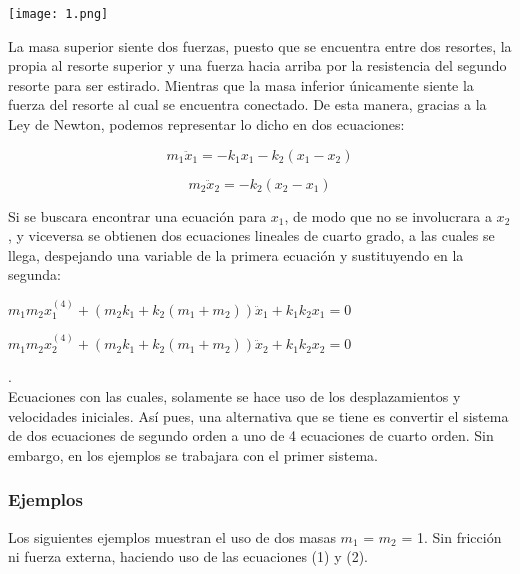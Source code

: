 \documentclass[12pt]{article}
\begin{document}
\begin{center}
        \texttt{[image: 1.png]}
\end{center}

La masa superior siente dos fuerzas, puesto que se encuentra entre dos resortes, la propia al resorte superior y una fuerza hacia arriba por la resistencia del segundo resorte para ser estirado. Mientras que la masa inferior únicamente siente la fuerza del resorte al cual se encuentra conectado. De esta manera, gracias a la Ley de Newton, podemos representar lo dicho en dos ecuaciones:

\begin{equation}
m_1 \ddot x_1 = -k_1x_1 - k_2(x_1-x_2)
\end{equation}

\begin{equation}
m_2 \ddot x_2 = -k_2(x_2-x_1)
\end{equation}

Si se buscara encontrar una ecuación para $x_1$, de modo que no se involucrara a $x_2$, y viceversa se obtienen dos ecuaciones lineales de cuarto grado, a las cuales se llega, despejando una variable de la primera ecuación y sustituyendo en la segunda:\\

\centerline{$m_1m_2x_1^{(4)} + (m_2k_1 + k_2(m_1+m_2)) \ddot x_1 + k_1k_2x_1=0$}
\centerline{$m_1m_2x_2^{(4)} + (m_2k_1 + k_2(m_1+m_2)) \ddot x_2 + k_1k_2x_2=0$}
.\\
Ecuaciones con las cuales, solamente se hace uso de los desplazamientos y velocidades iniciales. Así pues, una alternativa que se tiene es convertir el sistema de dos ecuaciones de segundo orden a uno de 4 ecuaciones de cuarto orden. Sin embargo, en los ejemplos se trabajara con el primer sistema. 

\subsubsection{Ejemplos} 
Los siguientes ejemplos muestran el uso de dos masas $m_1$ = $m_2$ = 1. Sin fricción ni fuerza externa, haciendo uso de las ecuaciones (1) y (2).
\end{document}
